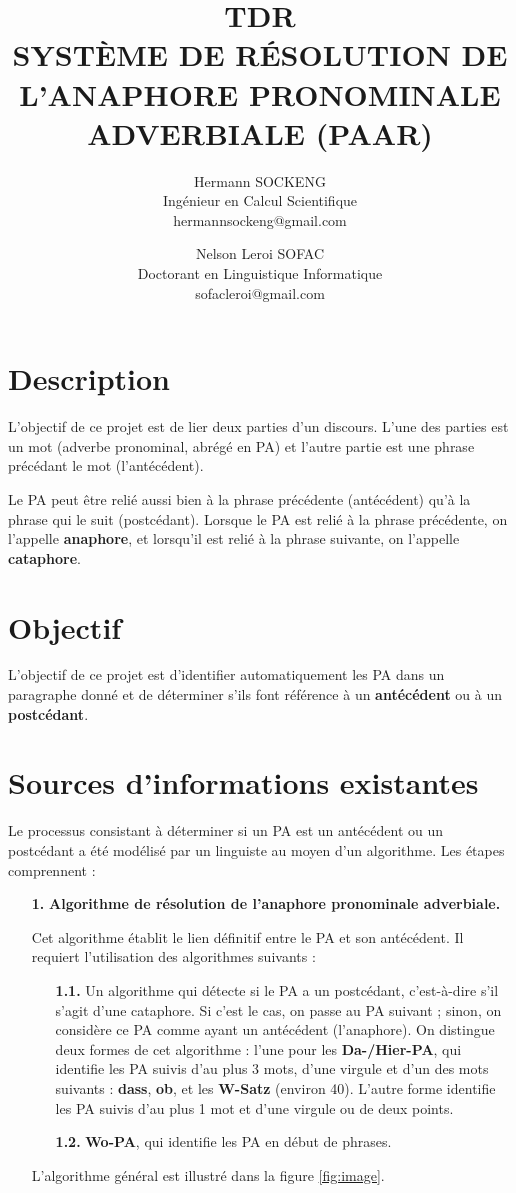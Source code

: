 \documentclass[]{article}
\title{\textbf{TDR}\\ SYSTÈME DE RÉSOLUTION DE L'ANAPHORE PRONOMINALE ADVERBIALE (PAAR)}
\author{Hermann SOCKENG\\ Ingénieur en Calcul Scientifique \\ hermannsockeng@gmail.com \and Nelson Leroi SOFAC \\ Doctorant en Linguistique Informatique\\ sofacleroi@gmail.com}
\begin{document}
	\maketitle
	
	\section{Description}
	L'objectif de ce projet est de lier deux parties d'un discours. L'une des parties est un mot (adverbe pronominal, abrégé en PA) et l'autre partie est une phrase précédant le mot (l'antécédent).
	
	Le PA peut être relié aussi bien à la phrase précédente (antécédent) qu'à la phrase qui le suit (postcédant). Lorsque le PA est relié à la phrase précédente, on l'appelle \textbf{anaphore}, et lorsqu'il est relié à la phrase suivante, on l'appelle \textbf{cataphore}.
	
	\section{Objectif}
	L'objectif de ce projet est d'identifier automatiquement les PA dans un paragraphe donné et de déterminer s'ils font référence à un \textbf{antécédent} ou à un \textbf{postcédant}.
	
	\section{Sources d'informations existantes}
	Le processus consistant à déterminer si un PA est un antécédent ou un postcédant a été modélisé par un linguiste au moyen d'un algorithme. Les étapes comprennent :
	
	\begin{itemize}
		\item[\textbf{1.}] \textbf{Algorithme de résolution de l'anaphore pronominale adverbiale.}
		
		Cet algorithme établit le lien définitif entre le PA et son antécédent. Il requiert l'utilisation des algorithmes suivants :
		
		\begin{itemize}
			\item[\textbf{1.1.}] Un algorithme qui détecte si le PA a un postcédant, c'est-à-dire s'il s'agit d'une cataphore. Si c'est le cas, on passe au PA suivant ; sinon, on considère ce PA comme ayant un antécédent (l'anaphore). On distingue deux formes de cet algorithme : l'une pour les \textbf{Da-/Hier-PA}, qui identifie les PA suivis d'au plus 3 mots, d'une virgule et d'un des mots suivants : \textbf{dass}, \textbf{ob}, et les \textbf{W-Satz} (environ 40). L'autre forme identifie les PA suivis d'au plus 1 mot et d'une virgule ou de deux points.
			
			\item[\textbf{1.2.}] \textbf{Wo-PA}, qui identifie les PA en début de phrases.
		\end{itemize}
		
		L'algorithme général est illustré dans la figure \ref{fig:image}.
	\end{itemize}
	
\end{document}
